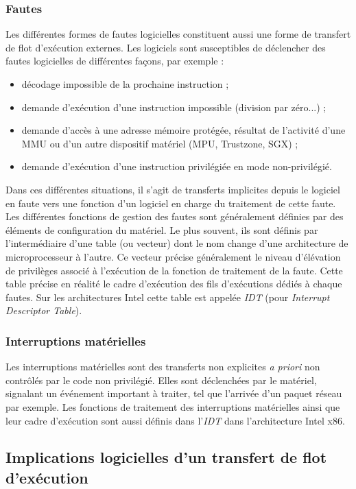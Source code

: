 			\subsubsection{Fautes}
\label{sec:faults}
Les différentes formes de fautes logicielles constituent aussi une forme de transfert de flot d'exécution externes. Les logiciels sont susceptibles de déclencher des fautes logicielles de différentes façons, par exemple :
\begin{itemize}
  \item décodage impossible de la prochaine instruction ;
  \item demande d'exécution d'une instruction impossible (division par zéro...) ; 
  \item demande d'accès à une adresse mémoire protégée, résultat de l'activité d'une MMU ou d'un autre dispositif matériel (MPU, Trustzone, SGX) ;  
  \item demande d'exécution d'une instruction privilégiée en mode non-privilégié.
\end{itemize}
Dans ces différentes situations, il s'agit de transferts implicites depuis le logiciel en faute vers une fonction d'un logiciel en charge du traitement de cette faute. Les différentes fonctions de gestion des fautes sont généralement définies par des éléments de configuration du matériel. Le plus souvent, ils sont définis par l'intermédiaire d'une table (ou vecteur) dont le nom change d'une architecture de microprocesseur à l'autre. Ce vecteur précise généralement le niveau d'élévation de privilèges associé à l'exécution de la fonction de traitement de la faute. Cette table précise en réalité le cadre d'exécution des fils d'exécutions dédiés à chaque fautes. Sur les architectures Intel cette table est appelée \emph{IDT} (pour \emph{Interrupt Descriptor Table}).
\label{IDT}

			\subsubsection{Interruptions matérielles}
			Les interruptions matérielles sont des transferts non explicites \textit{a priori} non contrôlés par le code non privilégié. Elles sont déclenchées par le matériel, signalant un événement important à traiter, tel que l'arrivée d'un paquet réseau par exemple. Les fonctions de traitement des interruptions matérielles ainsi que leur cadre d'exécution sont aussi définis dans l'\emph{IDT} dans l'architecture Intel x86.

		\subsection{Implications logicielles d'un transfert de flot d'exécution}

